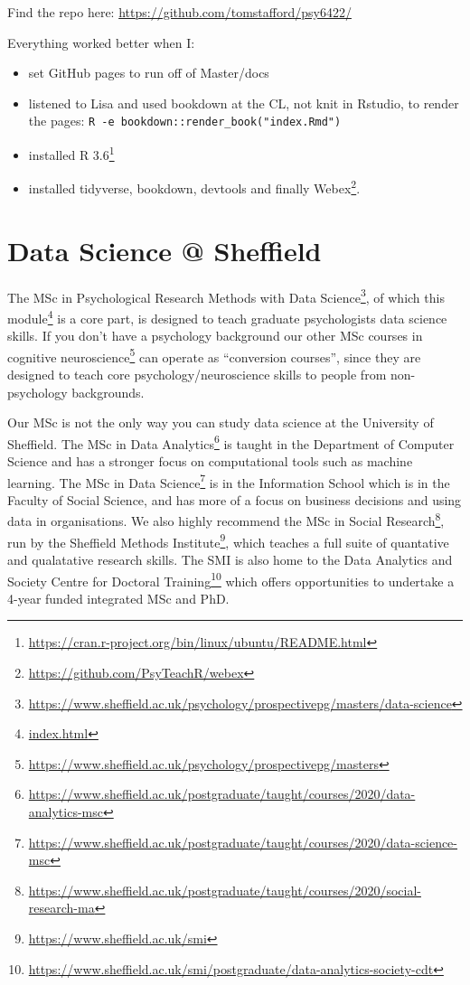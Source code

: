 \documentclass[
  12pt,
  a5paper,
]{book}
\DeclareRobustCommand{\href}[2]{#2\footnote{\url{#1}}}
\providecommand{\tightlist}{%
  \setlength{\itemsep}{0pt}\setlength{\parskip}{0pt}}
\begin{document}
Find the repo here: \url{https://github.com/tomstafford/psy6422/}

Everything worked better when I:

\begin{itemize}
\tightlist
\item
  set GitHub pages to run off of Master/docs
\item
  listened to Lisa and used bookdown at the CL, not knit in Rstudio, to render the pages: \texttt{R\ -e\ \textquotesingle{}bookdown::render\_book("index.Rmd")\textquotesingle{}}
\item
  installed \href{https://cran.r-project.org/bin/linux/ubuntu/README.html}{R 3.6}
\item
  installed tidyverse, bookdown, devtools and finally \href{https://github.com/PsyTeachR/webex}{Webex}.
\end{itemize}

\hypertarget{data-science-sheffield}{%
\section{Data Science @ Sheffield}\label{data-science-sheffield}}

The \href{https://www.sheffield.ac.uk/psychology/prospectivepg/masters/data-science}{MSc in Psychological Research Methods with Data Science}, of which \href{index.html}{this module} is a core part, is designed to teach graduate psychologists data science skills. If you don't have a psychology background our other \href{https://www.sheffield.ac.uk/psychology/prospectivepg/masters}{MSc courses in cognitive neuroscience} can operate as ``conversion courses'', since they are designed to teach core psychology/neuroscience skills to people from non-psychology backgrounds.

Our MSc is not the only way you can study data science at the University of Sheffield. The \href{https://www.sheffield.ac.uk/postgraduate/taught/courses/2020/data-analytics-msc}{MSc in Data Analytics} is taught in the Department of Computer Science and has a stronger focus on computational tools such as machine learning. The \href{https://www.sheffield.ac.uk/postgraduate/taught/courses/2020/data-science-msc}{MSc in Data Science} is in the Information School which is in the Faculty of Social Science, and has more of a focus on business decisions and using data in organisations. We also highly recommend the \href{https://www.sheffield.ac.uk/postgraduate/taught/courses/2020/social-research-ma}{MSc in Social Research}, run by the \href{https://www.sheffield.ac.uk/smi}{Sheffield Methods Institute}, which teaches a full suite of quantative and qualatative research skills. The SMI is also home to the \href{https://www.sheffield.ac.uk/smi/postgraduate/data-analytics-society-cdt}{Data Analytics and Society Centre for Doctoral Training} which offers opportunities to undertake a 4-year funded integrated MSc and PhD.
\end{document}

